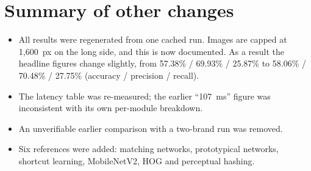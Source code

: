 \documentclass[10pt,a4paper]{article}
\begin{document}
\section*{Summary of other changes}
\begin{itemize}[nosep,leftmargin=1.2em]
\item All results were regenerated from one cached run. Images are capped at 1{,}600~px on the long side, and this is now documented. As a result the headline figures change slightly, from 57.38\% / 69.93\% / 25.87\% to 58.06\% / 70.48\% / 27.75\% (accuracy / precision / recall).
\item The latency table was re-measured; the earlier ``107~ms'' figure was inconsistent with its own per-module breakdown.
\item An unverifiable earlier comparison with a two-brand run was removed.
\item Six references were added: matching networks, prototypical networks, shortcut learning, MobileNetV2, HOG and perceptual hashing.
\end{itemize}
\end{document}
